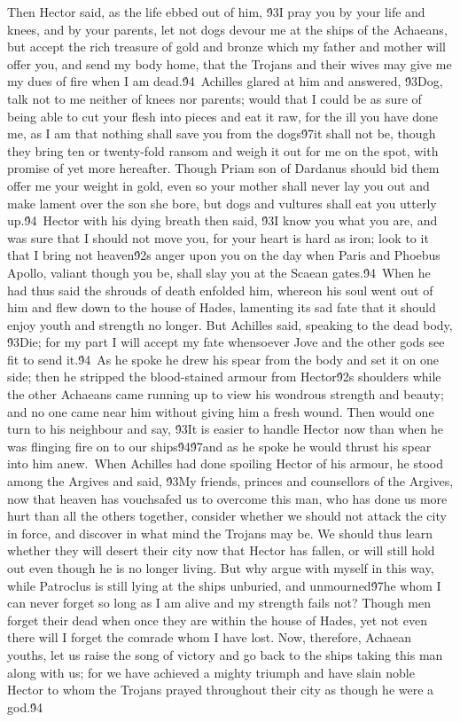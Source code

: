 {Then Hector said, as the life ebbed out of him, \'93I pray you by your life and knees, and by your parents, let not dogs devour me at the ships of the Achaeans, but accept the rich treasure of gold and bronze which my father and mother will offer you, and send my body home, that the Trojans and their wives may give me my dues of fire when I am dead.\'94\
Achilles glared at him and answered, \'93Dog, talk not to me neither of knees nor parents; would that I could be as sure of being able to cut your flesh into pieces and eat it raw, for the ill you have done me, as I am that nothing shall save you from the dogs\'97it shall not be, though they bring ten or twenty-fold ransom and weigh it out for me on the spot, with promise of yet more hereafter. Though Priam son of Dardanus should bid them offer me your weight in gold, even so your mother shall never lay you out and make lament over the son she bore, but dogs and vultures shall eat you utterly up.\'94\
Hector with his dying breath then said, \'93I know you what you are, and was sure that I should not move you, for your heart is hard as iron; look to it that I bring not heaven\'92s anger upon you on the day when Paris and Phoebus Apollo, valiant though you be, shall slay you at the Scaean gates.\'94\
When he had thus said the shrouds of death enfolded him, whereon his soul went out of him and flew down to the house of Hades, lamenting its sad fate that it should enjoy youth and strength no longer. But Achilles said, speaking to the dead body, \'93Die; for my part I will accept my fate whensoever Jove and the other gods see fit to send it.\'94\
As he spoke he drew his spear from the body and set it on one side; then he stripped the blood-stained armour from Hector\'92s shoulders while the other Achaeans came running up to view his wondrous strength and beauty; and no one came near him without giving him a fresh wound. Then would one turn to his neighbour and say, \'93It is easier to handle Hector now than when he was flinging fire on to our ships\'94\'97and as he spoke he would thrust his spear into him anew.\
When Achilles had done spoiling Hector of his armour, he stood among the Argives and said, \'93My friends, princes and counsellors of the Argives, now that heaven has vouchsafed us to overcome this man, who has done us more hurt than all the others together, consider whether we should not attack the city in force, and discover in what mind the Trojans may be. We should thus learn whether they will desert their city now that Hector has fallen, or will still hold out even though he is no longer living. But why argue with myself in this way, while Patroclus is still lying at the ships unburied, and unmourned\'97he whom I can never forget so long as I am alive and my strength fails not? Though men forget their dead when once they are within the house of Hades, yet not even there will I forget the comrade whom I have lost. Now, therefore, Achaean youths, let us raise the song of victory and go back to the ships taking this man along with us; for we have achieved a mighty triumph and have slain noble Hector to whom the Trojans prayed throughout their city as though he were a god.\'94\
}
